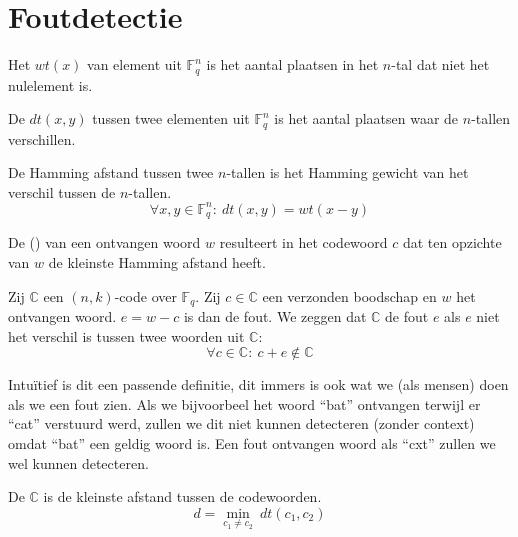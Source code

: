 \documentclass[main.tex]{subfiles}
\begin{document}
\section{Foutdetectie}

\begin{de}
  Het  $wt(x)$ van element uit $\mathbb{F}_{q}^{n}$ is het aantal plaatsen in het $n$-tal dat niet het nulelement is.
\end{de}

\begin{de}
  De  $dt(x,y)$ tussen twee elementen uit $\mathbb{F}_{q}^{n}$ is het aantal plaatsen waar de $n$-tallen verschillen.
\end{de}

\begin{ei}
  De Hamming afstand tussen twee $n$-tallen is het Hamming gewicht van het verschil tussen de $n$-tallen.
  \[ \forall x,y \in \mathbb{F}_{q}^{n}:\ dt(x,y) = wt(x-y) \]
\end{ei}

\begin{de}
  De  () van een ontvangen woord $w$ resulteert in het codewoord $c$ dat ten opzichte van $w$ de kleinste Hamming afstand heeft.
\end{de}


\begin{de}
  Zij $\mathbb{C}$ een $(n,k)$-code over $\mathbb{F}_{q}$.
  Zij $c\in \mathbb{C}$ een verzonden boodschap en $w$ het ontvangen woord.
  $e= w-c$ is dan de fout.
  We zeggen dat $\mathbb{C}$ de fout $e$  als $e$ niet het verschil is tussen twee woorden uit $\mathbb{C}$:
  \[ \forall c \in \mathbb{C}:\ c+e \not\in \mathbb{C} \]
\end{de}

\begin{opm}
  Intu\"itief is dit een passende definitie, dit immers is ook wat we (als mensen) doen als we een fout zien.
  Als we bijvoorbeel het woord ``bat'' ontvangen terwijl er ``cat'' verstuurd werd, zullen we dit niet kunnen detecteren (zonder context) omdat ``bat'' een geldig woord is.
  Een fout ontvangen woord als ``cxt'' zullen we wel kunnen detecteren.
\end{opm}

\begin{de}
  De  $\mathbb{C}$ is de kleinste afstand tussen de codewoorden.
  \[ d = \min_{c_{1}\neq c_{2}}\ dt(c_{1},c_{2}) \]
\end{de}
\end{document}

